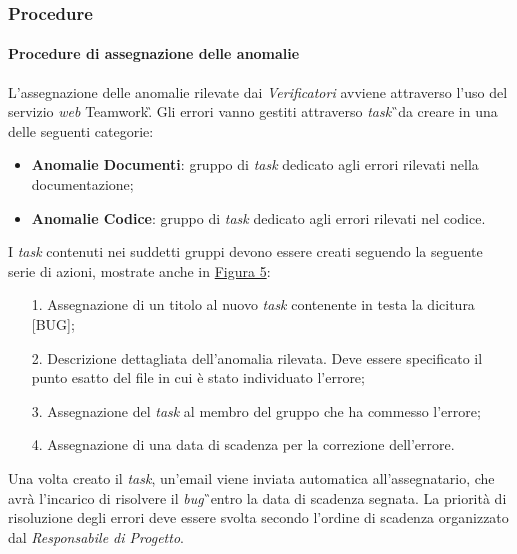 \subsubsection{Procedure}
\paragraph{Procedure di assegnazione delle anomalie}
L'assegnazione delle anomalie rilevate dai \textit{Verificatori} avviene attraverso l'uso del servizio \textit{web} Teamwork\G. Gli errori vanno gestiti attraverso \textit{task}\G\ da creare in una delle seguenti categorie:
\begin{itemize}
	\item \textbf{Anomalie Documenti}: gruppo di \textit{task} dedicato agli errori rilevati nella documentazione;
	\item \textbf{Anomalie Codice}: gruppo di \textit{task} dedicato agli errori rilevati nel codice.
\end{itemize}
I \textit{task} contenuti nei suddetti gruppi devono essere creati seguendo la seguente serie di azioni, mostrate anche in \hyperref[sec:Figura5]{Figura 5}:
\begin{itemize}
	\item [1.] Assegnazione di un titolo al nuovo \textit{task} contenente in testa la dicitura [BUG];
	\item [2.] Descrizione dettagliata dell'anomalia rilevata. Deve essere specificato il punto esatto del file in cui è stato individuato l'errore;
	\item [3.] Assegnazione del \textit{task} al membro del gruppo che ha commesso l'errore;
	\item [4.] Assegnazione di una data di scadenza per la correzione dell'errore.
\end{itemize} 
Una volta creato il \textit{task}, un'email viene inviata automatica all'assegnatario, che avrà l'incarico di risolvere il \textit{bug}\G\ entro la data di scadenza segnata. La priorità di risoluzione degli errori deve essere svolta secondo l'ordine di scadenza organizzato dal \textit{Responsabile di Progetto}.

